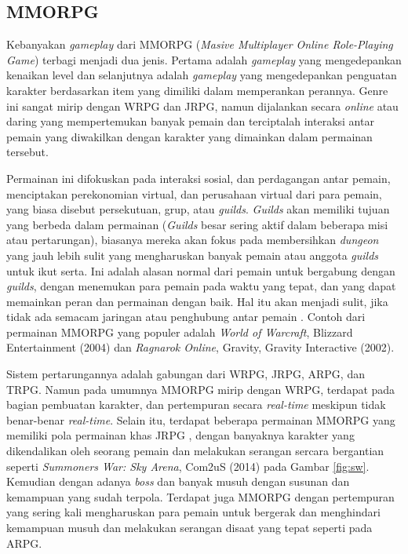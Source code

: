 \subsection{MMORPG}
\label{sec:sub_sec2_mmorpg}

Kebanyakan \textit{gameplay} dari MMORPG (\textit{Masive Multiplayer Online Role-Playing Game}) terbagi menjadi dua jenis. Pertama adalah \textit{gameplay} yang mengedepankan kenaikan level dan selanjutnya adalah \textit{gameplay} yang mengedepankan penguatan karakter berdasarkan item yang dimiliki dalam memperankan perannya. Genre ini sangat mirip dengan WRPG dan JRPG, namun dijalankan secara \textit{online} atau daring yang mempertemukan banyak pemain dan terciptalah interaksi antar pemain yang diwakilkan dengan karakter yang dimainkan dalam permainan tersebut.
\vspace{1ex}

Permainan ini difokuskan pada interaksi sosial, dan perdagangan antar pemain, menciptakan perekonomian virtual, dan perusahaan virtual dari para pemain, yang biasa disebut persekutuan, grup, atau \textit{guilds}. \textit{Guilds} akan memiliki tujuan yang berbeda dalam permainan (\textit{Guilds} besar sering aktif dalam beberapa misi atau pertarungan), biasanya mereka akan fokus pada membersihkan \textit{dungeon} yang jauh lebih sulit yang mengharuskan banyak pemain atau anggota \textit{guilds} untuk ikut serta. Ini adalah alasan normal dari pemain untuk bergabung dengan \textit{guilds}, dengan menemukan para pemain pada waktu yang tepat, dan yang dapat memainkan peran dan permainan dengan baik. Hal itu akan menjadi sulit, jika tidak ada semacam jaringan atau penghubung antar pemain \citep{yeenick2020}. Contoh dari permainan MMORPG yang populer adalah \textit{World of Warcraft}, Blizzard Entertainment (2004) dan \textit{Ragnarok Online}, Gravity, Gravity Interactive (2002). 
\vspace{1ex}

Sistem pertarungannya adalah gabungan dari WRPG, JRPG, ARPG, dan TRPG. Namun pada umumnya MMORPG mirip dengan WRPG, terdapat pada bagian pembuatan karakter, dan pertempuran secara \textit{real-time} meskipun tidak benar-benar \textit{real-time}. Selain itu, terdapat beberapa permainan MMORPG yang memiliki pola permainan khas JRPG \citep{moore2016}, dengan banyaknya karakter yang dikendalikan oleh seorang pemain dan melakukan serangan sercara bergantian seperti \textit{Summoners War: Sky Arena}, Com2uS (2014) pada Gambar \ref{fig:sw}. Kemudian dengan adanya \textit{boss} dan banyak musuh dengan susunan dan kemampuan yang sudah terpola. Terdapat juga MMORPG dengan pertempuran yang sering kali mengharuskan para pemain untuk bergerak dan menghindari kemampuan musuh dan melakukan serangan disaat yang tepat seperti pada ARPG.
\vspace{1ex}

